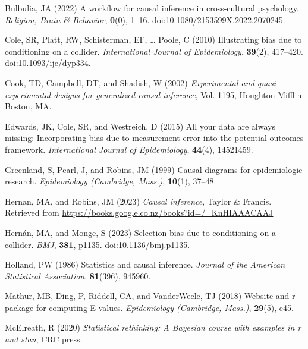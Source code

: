 \documentclass[
  singlecolumn]{article}
\newlength{\cslhangindent}
\newenvironment{CSLReferences}[2] %
 {\begin{list}{}{%
  \setlength{\itemindent}{0pt}
  \setlength{\leftmargin}{0pt}
  \setlength{\parsep}{0pt}
  \ifodd #1
   \setlength{\leftmargin}{\cslhangindent}
   \setlength{\itemindent}{-1\cslhangindent}
  \fi
  \setlength{\itemsep}{#2\baselineskip}}}
 {\end{list}}
\begin{document}
\label{refs}
\begin{CSLReferences}{1}{0}
Bulbulia, JA (2022) A workflow for causal inference in cross-cultural
psychology. \emph{Religion, Brain \& Behavior}, \textbf{0}(0), 1--16.
doi:\href{https://doi.org/10.1080/2153599X.2022.2070245}{10.1080/2153599X.2022.2070245}.

Cole, SR, Platt, RW, Schisterman, EF, \ldots{} Poole, C (2010)
Illustrating bias due to conditioning on a collider. \emph{International
Journal of Epidemiology}, \textbf{39}(2), 417--420.
doi:\href{https://doi.org/10.1093/ije/dyp334}{10.1093/ije/dyp334}.

Cook, TD, Campbell, DT, and Shadish, W (2002) \emph{Experimental and
quasi-experimental designs for generalized causal inference}, Vol. 1195,
Houghton Mifflin Boston, MA.

Edwards, JK, Cole, SR, and Westreich, D (2015) All your data are always
missing: Incorporating bias due to measurement error into the potential
outcomes framework. \emph{International Journal of Epidemiology},
\textbf{44}(4), 14521459.

Greenland, S, Pearl, J, and Robins, JM (1999) Causal diagrams for
epidemiologic research. \emph{Epidemiology (Cambridge, Mass.)},
\textbf{10}(1), 37--48.

Hernan, MA, and Robins, JM (2023) \emph{Causal inference}, Taylor \&
Francis. Retrieved from
\url{https://books.google.co.nz/books?id=/_KnHIAAACAAJ}

Hernán, MA, and Monge, S (2023) Selection bias due to conditioning on a
collider. \emph{BMJ}, \textbf{381}, p1135.
doi:\href{https://doi.org/10.1136/bmj.p1135}{10.1136/bmj.p1135}.

Holland, PW (1986) Statistics and causal inference. \emph{Journal of the
American Statistical Association}, \textbf{81}(396), 945960.

Mathur, MB, Ding, P, Riddell, CA, and VanderWeele, TJ (2018) Website and
r package for computing {E}-values. \emph{Epidemiology (Cambridge,
Mass.)}, \textbf{29}(5), e45.

McElreath, R (2020) \emph{Statistical rethinking: A {B}ayesian course
with examples in r and stan}, CRC press.


\end{CSLReferences}
\end{document}
